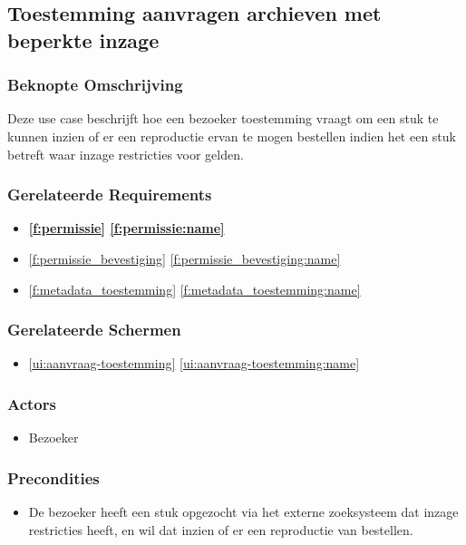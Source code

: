 \documentclass[a4paper,titlepage]{report}
\makeatletter
\def\namedlabel#1#2{
  \label{#1}
  \begingroup
   \def\@currentlabel{#2}%
   \label{#1:name}\endgroup
}
\def\namedref#1{\ref{#1} \ref{#1:name}}
\makeatother
\begin{document}
    \pagebreak
    \subsection{Toestemming aanvragen archieven met beperkte inzage}
    \namedlabel{u:toestemming_aanvragen}{Toestemming aanvragen}
      \subsubsection{Beknopte Omschrijving}
        Deze use case beschrijft hoe een bezoeker toestemming vraagt om een
        stuk te kunnen inzien of er een reproductie ervan te mogen bestellen
        indien het een stuk betreft waar inzage restricties voor gelden.
      \subsubsection{Gerelateerde Requirements}
        \begin{itemize}
          \item \textbf{\namedref{f:permissie}}
          \item \namedref{f:permissie_bevestiging}
          \item \namedref{f:metadata_toestemming}
        \end{itemize}
      \subsubsection{Gerelateerde Schermen}
        \begin{itemize}
          \item \namedref{ui:aanvraag-toestemming}
        \end{itemize}
      \subsubsection{Actors}
        \begin{itemize}
          \item Bezoeker
        \end{itemize}
      \subsubsection{Precondities}
        \begin{itemize}
          \item De bezoeker heeft een stuk opgezocht via het externe
            zoeksysteem dat inzage restricties heeft, en wil dat inzien of er
            een reproductie van bestellen.
        \end{itemize}
\end{document}
